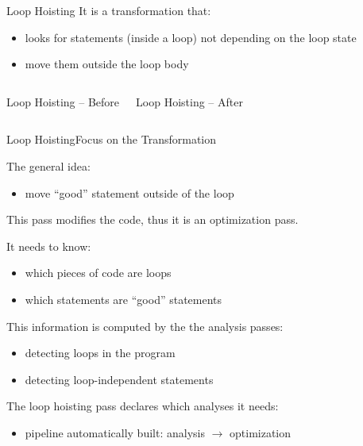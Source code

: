 \begin{frame}{Loop Hoisting}
It is a transformation that:
\begin{itemize}
\item looks for statements (inside a loop) not depending on the loop state
\item move them outside the loop body
\end{itemize}

\begin{columns}[t]
\begin{block}{Loop Hoisting -- Before}
\centering
{}
\end{block}

\begin{block}{Loop Hoisting -- After}
\centering
{}
\end{block}
\end{columns}
\end{frame}


\begin{frame}{Loop Hoisting}{Focus on the Transformation}
\begin{block}{The general idea:}
\begin{itemize}
\item move ``good'' statement outside of the loop
\end{itemize}
\end{block}

This \alert{pass} modifies the code, thus it is an \alert{optimization pass}.

It needs to know:
\begin{itemize}
\item which pieces of code are loops
\item which statements are ``good'' statements
\end{itemize}

This information is computed by the the \alert{analysis} passes:

\begin{itemize}
\item detecting loops in the program
\item detecting loop-independent statements
\end{itemize}

The loop hoisting pass declares which analyses it needs:

\begin{itemize}
\item pipeline automatically built: \alert{analysis $\rightarrow$ optimization}
\end{itemize}
\end{frame}


